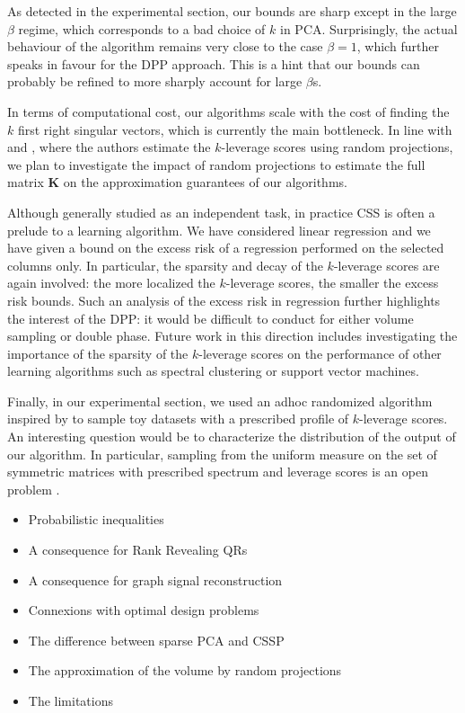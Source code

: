 \documentclass[twoside,11pt]{book}
\numberwithin{theorem}{chapter}
\numberwithin{definition}{chapter}
\numberwithin{proposition}{chapter}
\numberwithin{corollary}{chapter}
\numberwithin{example}{chapter}
\numberwithin{lemma}{chapter}
\begin{document}
As detected in the experimental section, our bounds are sharp except in the large $\beta$ regime, which corresponds to a bad choice of $k$ in PCA. Surprisingly, the actual behaviour of the algorithm remains very close to the case $\beta=1$, which further speaks in favour for the DPP approach. This is a hint that our bounds can probably be refined to more sharply account for large $\beta$s.

In terms of computational cost, our algorithms scale with the cost of finding the $k$ first right singular vectors, which is currently the main bottleneck. In line with \cite{DMMW12} and \cite{BoDrMI11}, where the authors estimate the $k$-leverage scores using random projections, we plan to investigate the impact of random projections to estimate the full matrix $\bm{K}$ on the approximation guarantees of our algorithms.

Although generally studied as an independent task, in practice CSS is often a prelude to a learning algorithm. We have considered linear regression and we have given a bound on the excess risk of a regression performed on the selected columns only. In particular, the sparsity and decay of the $k$-leverage scores are again involved: the more localized the $k$-leverage scores, the smaller the excess risk bounds. Such an analysis of the excess risk in regression further highlights the interest of the DPP: it would be difficult to conduct for either volume sampling or double phase. Future work in this direction includes investigating the importance of the sparsity of the $k$-leverage scores on the performance of other learning algorithms such as spectral clustering or support vector machines.

Finally, in our experimental section, we used an adhoc randomized algorithm inspired by \cite{FMPS13} to sample toy datasets with a prescribed profile of $k$-leverage scores. An interesting question would be to characterize the distribution of the output of our algorithm. In particular, sampling from the uniform measure on the set of symmetric matrices with prescribed spectrum and leverage scores is an open problem \citep*{DhHeSuTr05}. %


\begin{itemize}
\item Probabilistic inequalities
\item A consequence for Rank Revealing QRs
\item A consequence for graph signal reconstruction
\item Connexions with optimal design problems
\item The difference between sparse PCA and CSSP
\item The approximation of the volume by random projections 
\item The limitations 
\end{itemize}
\end{document}
